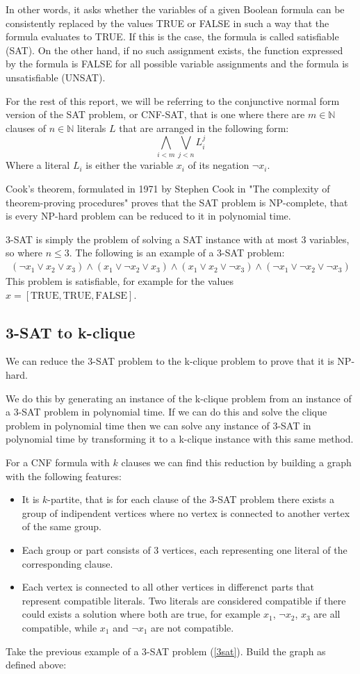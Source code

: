 \documentclass[table]{article}
\newcommand{\TRUE}{\text{TRUE}}
\newcommand{\FALSE}{\text{FALSE}}
\begin{document}
In other words, it asks whether the variables of a given Boolean formula can be consistently replaced by the values TRUE or FALSE in such a way that the formula evaluates to TRUE. If this is the case, the formula is called satisfiable (SAT). On the other hand, if no such assignment exists, the function expressed by the formula is FALSE for all possible variable assignments and the formula is unsatisfiable (UNSAT).

For the rest of this report, we will be referring to the conjunctive normal form version of the SAT problem, or CNF-SAT, that is one where there are $m\in\mathbb{N}$ clauses of $n\in\mathbb{N}$ literals $L$ that are arranged in the following form:
\[ \bigwedge_{i<m}\bigvee_{j<n}L_i^j \]
Where a literal $L_i$ is either the variable $x_i$ of its negation $\neg x_i$.

Cook's theorem, formulated in 1971 by Stephen Cook in "The complexity of theorem-proving procedures"%
proves that the SAT problem is NP-complete, that is every NP-hard problem can be reduced to it in polynomial time.

3-SAT is simply the problem of solving a SAT instance with at most 3 variables, so where $n\leq3$. The following is an example of a 3-SAT problem:
\begin{align}
    (\neg x_1 \lor x_2 \lor x_3)\land(x_1 \lor \neg x_2 \lor x_3)\land(x_1 \lor x_2 \lor \neg x_3)\land(\neg x_1 \lor \neg x_2 \lor \neg x_3)\label{3sat}
\end{align}
This problem is satisfiable, for example for the values $x = [\TRUE, \TRUE, \FALSE]$. 
\subsection{3-SAT to k-clique}
We can reduce the 3-SAT problem to the k-clique problem to prove that it is NP-hard.

We do this by generating an instance of the k-clique problem from an instance of a 3-SAT problem in polynomial time. 
If we can do this and solve the clique problem in polynomial time then we can solve any instance of 3-SAT in polynomial time by transforming it to a k-clique instance with this same method.

For a CNF formula with $k$ clauses we can find this reduction by building a graph with the following features:
\begin{itemize}
    \item It is $k$-partite, that is for each clause of the 3-SAT problem there exists a group of indipendent vertices where no vertex is connected to another vertex of the same group.
    \item Each group or part consists of 3 vertices, each representing one literal of the corresponding clause.
    \item Each vertex is connected to all other vertices in differenct parts that represent compatible literals. Two literals are considered compatible if there could exists a solution where both are true, for example $x_1$, $\neg x_2$, $x_3$ are all compatible, while $x_1$ and $\neg x_1$ are not compatible.
\end{itemize}
Take the previous example of a 3-SAT problem (\ref{3sat}). Build the graph as defined above:
\end{document}
